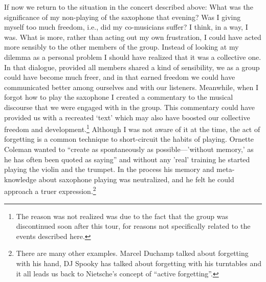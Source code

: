 \documentclass[a4paper]{article}
\begin{document}
If now we return to the situation in the concert described above: What was the significance of my non-playing of the saxophone that evening? Was I giving myself too much freedom, i.e., did my co-musicians suffer? I think, in a way, I was. What is more, rather than acting out my own frustration, I could have acted more sensibly to the other members of the group. Instead of looking at my dilemma as a personal problem I should have realized that it was a collective one. In that dialogue, provided all members shared a kind of sensibility, we as a group could have become much freer, and in that earned freedom we could have communicated better among ourselves and with our listeners. Meanwhile, when I forgot how to play the saxophone I created a commentary to the musical discourse that we were engaged with in the group. This commentary could have provided us with a recreated `text' which may also have boosted our collective freedom and development.\footnote{The reason was not realized was due to the fact that the group was discontinued soon after this tour, for reasons not specifically related to the events described here.} Although I was not aware of it at the time, the act of forgetting is a common technique to short-circuit the habits of playing. Ornette Coleman wanted to ``create as spontaneously as possible---'without memory,' as he has often been quoted as saying'' \citep[][p. 117]{litzweiler92} and without any 'real' training he started playing the violin and the trumpet. In the process his memory and meta-knowledge about saxophone playing was neutralized, and he felt he could approach a truer expression.\footnote{There are many other examples. Marcel Duchamp talked about forgetting with his hand, DJ Spooky has talked about forgetting with his turntables and it all leads us back to Nietsche's concept of ``active forgetting''.} 
\end{document}
